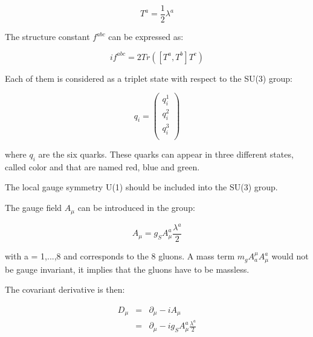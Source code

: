     \begin{equation}
        T^a = \frac{1}{2}\lambda^a
    \end{equation}

    The structure constant $f^{abc}$ can be expressed as:

    \begin{equation}
        if^{abc} = 2 Tr([T^a,T^b]T^c)
    \end{equation}
     
    Each of them is considered as a triplet state with respect to the SU(3) group:

    \begin{equation}
      q_i = 
        \begin{pmatrix}
          q_i^1 \\
          q_i^2 \\
          q_i^3 \\
        \end{pmatrix}
     \end{equation}
    
    where $q_i$ are the six quarks.
    These quarks can appear in three different states, called color and that are named red, blue and green.

    The local gauge symmetry U(1) should be included into the SU(3) group.
    
    The gauge field $A_{\mu}$ can be introduced in the group:
    
    \begin{equation}
      A_{\mu} = g_S A^a_{\mu}\frac{\lambda^a}{2}
    \end{equation}
     
    with a = 1,...,8 and corresponds to the 8 gluons.
    A mass term  $m_g A^{\mu}_a A^a_{\mu}$ would not be gauge invariant, it implies that the gluons have to be massless.

    The covariant derivative is then:

    \begin{equation}
      \begin{array}{rcl}
        D_{\mu} & = & \partial_{\mu} - i A_{\mu} \\
                & = & \partial_{\mu} - i g_S A^a_{\mu} \frac{\lambda^a}{2}
      \end{array}
    \end{equation}

